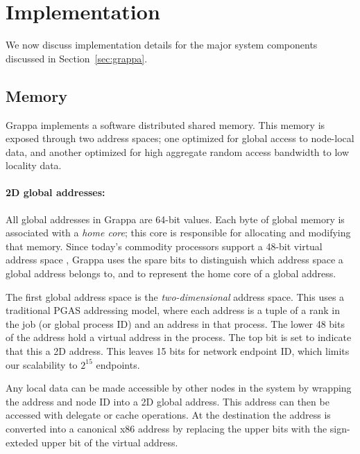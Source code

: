 \section{Implementation} \label{sec:implementation}

We now discuss implementation details for the major system components discussed in Section~\ref{sec:grappa}.

\subsection{Memory}

Grappa implements a software distributed shared memory. This memory is
exposed through two address spaces; one optimized for global access to
node-local data, and another optimized for high aggregate random
access bandwidth to low locality data.

\paragraph{2D global addresses:} All global addresses in Grappa are 64-bit values. Each byte of global
memory is associated with a {\em home core}; this core is responsible
for allocating and modifying that memory. Since today's commodity
processors support a 48-bit virtual address space , Grappa
uses the spare bits to distinguish which address space a global
address belongs to, and to represent the home core of a global
address.

The first global address space is the {\em two-dimensional} address
space. This uses a traditional PGAS addressing model, where each
address is a tuple of a rank in the job (or global process ID) and an
address in that process. The lower 48 bits of the address hold a
virtual address in the process. The top bit is set to indicate that
this a 2D address. This leaves 15 bits for network endpoint ID, which
limits our scalability to $2^15$ endpoints.

Any local data can be made accessible by other nodes in the system by
wrapping the address and node ID into a 2D global address. This
address can then be accessed with delegate or cache operations. At the
destination the address is converted into a canonical x86 address by
replacing the upper bits with the sign-exteded upper bit of the
virtual address.

